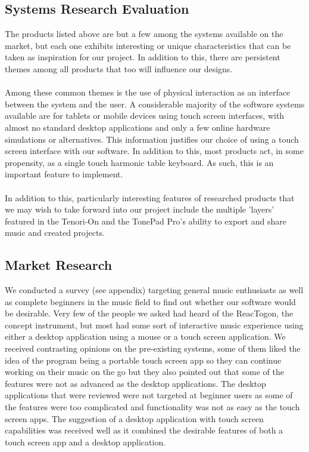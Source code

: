 \documentclass[10pt,a4paper]{article}
\begin{document}
\subsection{Systems Research Evaluation}
The products listed above are but a few among the systems available on the market, but each one exhibits interesting or unique characteristics that can be taken as inspiration for our project. In addition to this, there are persistent themes among all products that too will influence our designs.\\
\\
Among these common themes is the use of physical interaction as an interface between the system and the user. A considerable majority of the software systems available are for tablets or mobile devices using touch screen interfaces, with almost no standard desktop applications and only a few online hardware simulations or alternatives. This information justifies our choice of using a touch screen interface with our software. In addition to this, most products act, in some propensity, as a single touch harmonic table keyboard. As such, this is an important feature to implement.\\
\\
In addition to this, particularly interesting features of researched products that we may wish to take forward into our project include the multiple 'layers' featured in the Tenori-On and the TonePad Pro's ability to export and share music and created projects. 

\pagebreak
\subsection{Market Research}
We conducted a survey (see appendix) targeting general music enthusiasts as well as complete beginners in the music field to find out whether our software would be desirable. Very few of the people we asked had heard of the ReacTogon, the concept instrument, but most had some sort of interactive music experience using either a desktop application using a mouse or a touch screen application. We received contrasting opinions on the pre-existing systems, some of them liked the idea of the program being a portable touch screen app so they can continue working on their music on the go but they also pointed out that some of the features were not as advanced as the desktop applications. The desktop applications that were reviewed were not targeted at beginner users as some of the features were too complicated and functionality was not as easy as the touch screen apps. The suggestion of a desktop application with touch screen capabilities was received well as it combined the desirable features of both a touch screen app and a desktop application. 
 
\end{document}
